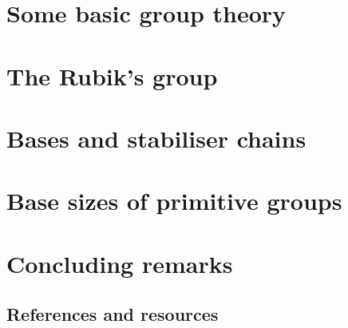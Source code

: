 \documentclass{beamer}
\begin{document}
\section{Some basic group theory}



\section{The Rubik's group}



\section{Bases and stabiliser chains}



\section{Base sizes of primitive groups}



\section{Concluding remarks}

\subsection{References and resources}
\end{document}
